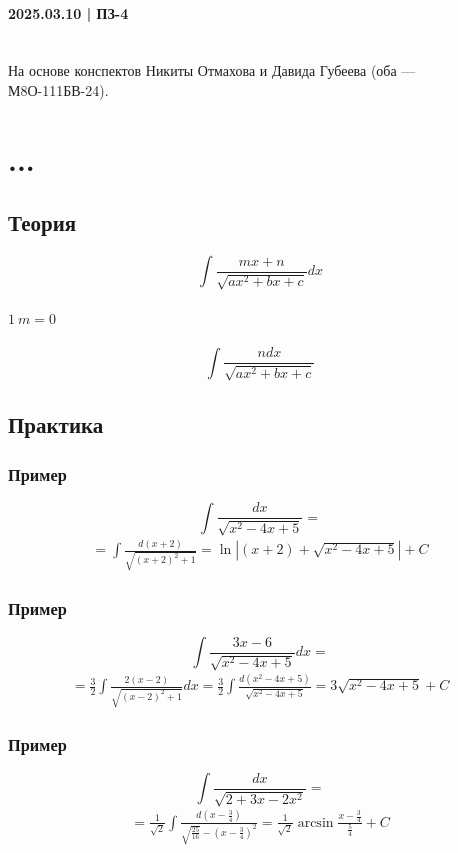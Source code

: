 \documentclass{article}
\begin{document}
\newpage
\paragraph{2025.03.10 | ПЗ-4}
~\\ На основе конспектов Никиты Отмахова и Давида Губеева (оба — М8О-111БВ-24).

\section{...}
\subsection{Теория}
\[
    \int \frac{mx + n}{\sqrt{ax^2 + bx + c}} dx
\]
\paragraph{$\boxed{1} ~m = 0$}
\[
    \int \frac{n dx}{\sqrt{ax^2 + bx + c}}
\]


\subsection{Практика}
\subsubsection{Пример}
\[
    \int \frac{dx}{\sqrt{x^2 - 4x + 5}} = 
\]
\begin{gather*}
    = \int \frac{d(x + 2)}{\sqrt{(x + 2)^2 + 1}} =
      \ln \left|(x + 2) + \sqrt{x^2 - 4x + 5}\right| + C
\end{gather*}

\subsubsection{Пример}
\[
    \int \frac{3x - 6}{\sqrt{x^2 - 4x + 5}} dx =
\]
\begin{gather*}
    = \frac{3}{2} \int \frac{2(x - 2)}{\sqrt{(x - 2)^2 + 1}} dx =
      \frac{3}{2} \int \frac{d(x^2 - 4x + 5)}{\sqrt{x^2 - 4x + 5}} =
      3 \sqrt{x^2 - 4x + 5} + C
\end{gather*}

\subsubsection{Пример}
\[
    \int \frac{dx}{\sqrt{2 + 3x - 2x^2}} =
\]
\begin{gather*}
    = \frac{1}{\sqrt{2}} \int \frac{d \left(x - \frac{3}{4}\right)}{\sqrt{\frac{25}{16}} - \left(x - \frac{3}{4}\right)^2} =
      \frac{1}{\sqrt{2}} \arcsin \frac{x - \frac{3}{4}}{\frac{5}{4}} + C
\end{gather*}
\end{document}
